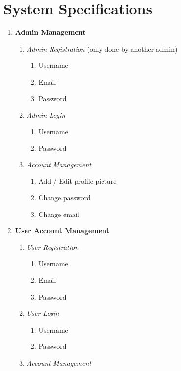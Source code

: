 \section{System Specifications}
\begin{enumerate}
    \item \textbf{Admin Management} \begin{enumerate}
        \item \textit{Admin Registration} (only done by another admin) \begin{enumerate}
            \item Username
            \item Email
            \item Password
        \end{enumerate}
        \item \textit{Admin Login} \begin{enumerate}
            \item Username
            \item Password
        \end{enumerate}
        \item \textit{Account Management} \begin{enumerate}
            \item Add / Edit profile picture
            \item Change password
            \item Change email
        \end{enumerate}
    \end{enumerate}
    \item \textbf{User Account Management} \begin{enumerate}
        \item \textit{User Registration} \begin{enumerate}
            \item Username
            \item Email
            \item Password
        \end{enumerate}
        \item \textit{User Login} \begin{enumerate}
            \item Username
            \item Password
        \end{enumerate}
        \item \textit{Account Management} \begin{enumerate}

\end{enumerate}
\end{enumerate}
\end{enumerate}
